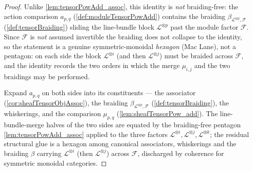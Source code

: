 \begin{proof}
    \leanok
  Unlike \cref{lem:tensorPowAdd_assoc}, this identity is \emph{not} braiding-free:
  the action comparison \(a_{p,q}\) (\cref{def:moduleTensorPowAdd}) contains the
  braiding \(\beta_{\mathcal{L}^{\otimes p},\mathcal{F}}\) (\cref{def:tensorBraiding})
  sliding the line-bundle block \(\mathcal{L}^{\otimes p}\) past the module factor
  \(\mathcal{F}\). Since \(\mathcal{F}\) is \emph{not} assumed invertible the braiding
  does not collapse to the identity, so the statement is a genuine
  symmetric-monoidal \emph{hexagon} (Mac Lane), not a pentagon: on each side the
  block \(\mathcal{L}^{\otimes i}\) (and then \(\mathcal{L}^{\otimes j}\)) must be
  braided across \(\mathcal{F}\), and the identity records the two orders in which
  the merge \(\mu_{i,j}\) and the two braidings may be performed.

  Expand \(a_{p,q}\) on both sides into its constituents --- the associator
  (\cref{cor:sheafTensorObjAssoc}), the braiding
  \(\beta_{\mathcal{L}^{\otimes p},\mathcal{F}}\) (\cref{def:tensorBraiding}), the
  whiskerings, and the comparison \(\mu_{p,q}\) (\cref{lem:sheafTensorPow_add}). The
  line-bundle-merge halves of the two sides are equated by the braiding-free pentagon
  \cref{lem:tensorPowAdd_assoc} applied to the three factors
  \(\mathcal{L}^{\otimes i},\mathcal{L}^{\otimes j},\mathcal{L}^{\otimes k}\); the
  residual structural glue is a hexagon among canonical associators, whiskerings and
  the braiding \(\beta\) carrying \(\mathcal{L}^{\otimes i}\) (then
  \(\mathcal{L}^{\otimes j}\)) across \(\mathcal{F}\), discharged by coherence for
  symmetric monoidal categories.
\end{proof}

